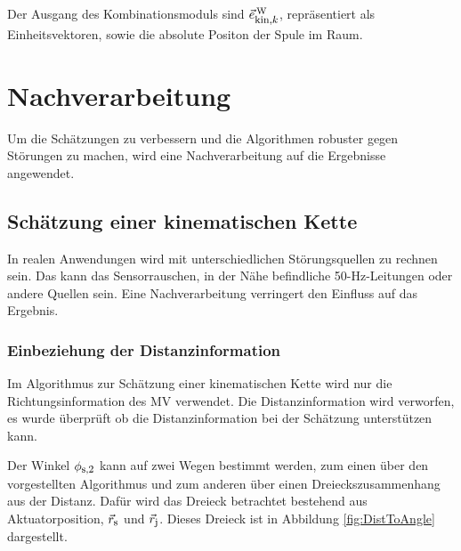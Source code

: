 Der Ausgang des Kombinationsmoduls sind $\vec{e}_{\textrm{\footnotesize{kin,$k$}}}^{\,\text{W}}$, repräsentiert als Einheitsvektoren, sowie die absolute Positon der Spule im Raum. 

\section{Nachverarbeitung}
Um die Schätzungen zu verbessern und die Algorithmen robuster gegen Störungen zu machen, wird eine Nachverarbeitung auf die Ergebnisse angewendet.


\subsection{Schätzung einer kinematischen Kette}
In realen Anwendungen wird mit unterschiedlichen Störungsquellen zu rechnen sein. Das kann das Sensorrauschen, in der Nähe befindliche 50-Hz-Leitungen oder andere Quellen sein. Eine Nachverarbeitung verringert den Einfluss auf das Ergebnis.

\subsubsection{Einbeziehung der Distanzinformation}
  Im Algorithmus zur Schätzung einer kinematischen Kette wird nur die Richtungsinformation des MV verwendet. Die Distanzinformation wird verworfen, es wurde überprüft ob die Distanzinformation bei der Schätzung unterstützen kann.
  
  Der Winkel $\phi_{\textrm{\footnotesize{s,2}}}$ kann auf zwei Wegen bestimmt werden, zum einen über den vorgestellten Algorithmus und zum anderen über einen Dreieckszusammenhang aus der Distanz.  Dafür wird das Dreieck betrachtet bestehend aus Aktuatorposition, $\vec{r}_{\textrm{\footnotesize{s}}}$ und $\vec{r}_{\textrm{\footnotesize{j}}}$. Dieses Dreieck ist in Abbildung \ref{fig:DistToAngle} dargestellt.

